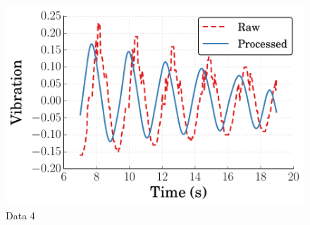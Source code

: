 \documentclass[11pt]{article}
\begin{document}
\begin{figure}[h!] %
   \centering
   \includegraphics[width=5in]{vibration_data4.pdf} 
   \caption{Data 4}
   \label{fig:example}
\end{figure}

\newpage
\end{document}
